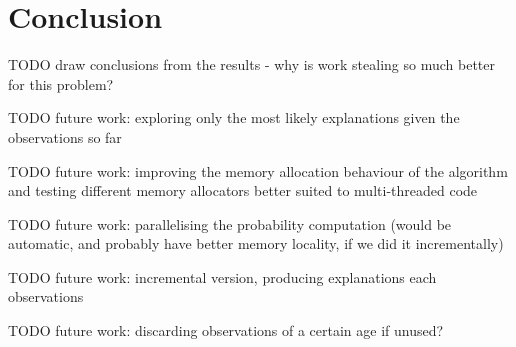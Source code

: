\chapter{Conclusion}

TODO draw conclusions from the results - why is work stealing so much better for this problem?

TODO future work: exploring only the most likely explanations given the observations so far

TODO future work: improving the memory allocation behaviour of the algorithm and testing different memory allocators better suited to multi-threaded code

TODO future work: parallelising the probability computation (would be automatic, and probably have better memory locality, if we did it incrementally)

TODO future work: incremental version, producing explanations each observations

TODO future work: discarding observations of a certain age if unused?
